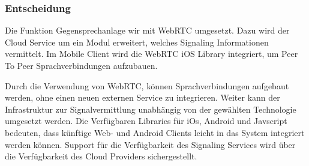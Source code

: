 \subsubsection{Entscheidung}

Die Funktion Gegensprechanlage wir mit WebRTC umgesetzt.
Dazu wird der Cloud Service um ein Modul erweitert, welches Signaling Informationen vermittelt.
Im Mobile Client wird die WebRTC iOS Library integriert, um Peer To Peer Sprachverbindungen aufzubauen.

Durch die Verwendung von WebRTC, können Sprachverbindungen aufgebaut werden, ohne einen neuen externen Service zu integrieren.
Weiter kann der Infrastruktur zur Signalvermittlung unabhängig von der gewählten Technologie umgesetzt werden.
Die Verfügbaren Libraries für iOs, Android und Javscript bedeuten, dass künftige Web- und Android Clients leicht in das System integriert werden können.
Support für die Verfügbarkeit des Signaling Services wird über die Verfügbarkeit des Cloud Providers sichergestellt.

\clearpage
